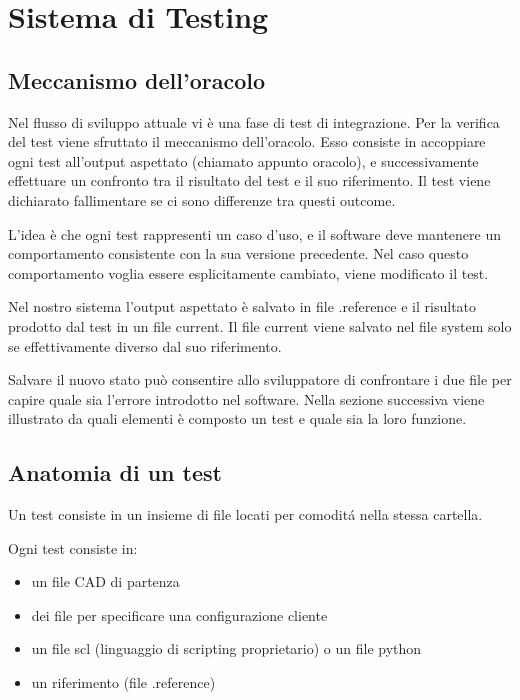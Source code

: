 \chapter{Sistema di Testing}
    \section{Meccanismo dell'oracolo\label{oracolo}}
        Nel flusso di sviluppo attuale vi è una fase di test di integrazione.
        Per la verifica del test viene sfruttato il meccanismo dell’oracolo.
        Esso consiste in accoppiare ogni test all'output aspettato (chiamato appunto oracolo),
        e successivamente effettuare un confronto tra il risultato del test e il suo riferimento.
        Il test viene dichiarato fallimentare se ci sono differenze tra questi outcome.
        
        L'idea è che ogni test rappresenti un caso d'uso, e il software deve mantenere un comportamento 
        consistente con la sua versione precedente.
        Nel caso questo comportamento voglia essere esplicitamente cambiato, viene modificato il test.

        Nel nostro sistema l'output aspettato è salvato in file .reference e il risultato prodotto
        dal test in un file current.
        Il file current viene salvato nel file system solo se effettivamente diverso dal suo riferimento.
        
        Salvare il nuovo stato può consentire allo sviluppatore di confrontare i due file per capire quale sia l'errore introdotto nel software. \newline
        Nella sezione successiva viene illustrato da quali elementi è composto un test e quale sia la loro funzione.
    \section{Anatomia di un test\label{testanatomy}}
        Un test consiste in un insieme di file locati per comodit\'a nella stessa cartella. 

        Ogni test consiste in:
        \begin{itemize}
            \item un file CAD di partenza
            \item dei file per specificare una configurazione cliente
            \item un file scl (linguaggio di scripting proprietario) o un file python
            \item un riferimento (file .reference)
        \end{itemize}
